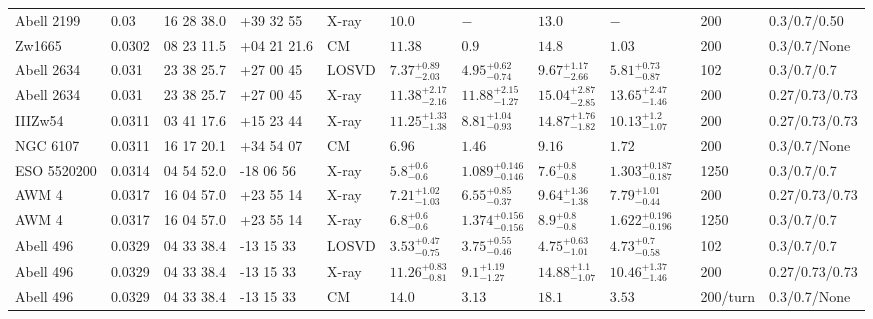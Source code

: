 \begin{landscape}
\begin{center}
{\begin{longtable}{llllllllllll}
Abell 2199 & 0.03 & 16 28 38.0 & +39 32 55 & X-ray & ${10.0}^{}_{}$ & ${-}^{}_{}$ & ${13.0}^{}_{}$ & ${-}^{}_{}$ & \citet{MA99.1} & 200 & 0.3/0.7/0.50 \\
Zw1665 & 0.0302 & 08 23 11.5 & +04 21 21.6 & CM & ${11.38}^{}_{}$ & ${0.9}^{}_{}$ & ${14.8}^{}_{}$ & ${1.03}^{}_{}$ & \citet{RI06.1} & 200 & 0.3/0.7/None \\
Abell 2634 & 0.031 & 23 38 25.7 & +27 00 45 & LOSVD & ${7.37}^{+0.89}_{-2.03}$ & ${4.95}^{+0.62}_{-0.74}$ & ${9.67}^{+1.17}_{-2.66}$ & ${5.81}^{+0.73}_{-0.87}$ & \citet{WO10.1} & 102 & 0.3/0.7/0.7 \\
Abell 2634 & 0.031 & 23 38 25.7 & +27 00 45 & X-ray & ${11.38}^{+2.17}_{-2.16}$ & ${11.88}^{+2.15}_{-1.27}$ & ${15.04}^{+2.87}_{-2.85}$ & ${13.65}^{+2.47}_{-1.46}$ & \citet{BA14.1} & 200 & 0.27/0.73/0.73 \\
IIIZw54 & 0.0311 & 03 41 17.6 & +15 23 44 & X-ray & ${11.25}^{+1.33}_{-1.38}$ & ${8.81}^{+1.04}_{-0.93}$ & ${14.87}^{+1.76}_{-1.82}$ & ${10.13}^{+1.2}_{-1.07}$ & \citet{BA14.1} & 200 & 0.27/0.73/0.73 \\
NGC 6107 & 0.0311 & 16 17 20.1 & +34 54 07 & CM & ${6.96}^{}_{}$ & ${1.46}^{}_{}$ & ${9.16}^{}_{}$ & ${1.72}^{}_{}$ & \citet{RI06.1} & 200 & 0.3/0.7/None \\
ESO 5520200 & 0.0314 & 04 54 52.0 & -18 06 56 & X-ray & ${5.8}^{+0.6}_{-0.6}$ & ${1.089}^{+0.146}_{-0.146}$ & ${7.6}^{+0.8}_{-0.8}$ & ${1.303}^{+0.187}_{-0.187}$ & \citet{GA06.1} & 1250 & 0.3/0.7/0.7 \\
AWM 4 & 0.0317 & 16 04 57.0 & +23 55 14 & X-ray & ${7.21}^{+1.02}_{-1.03}$ & ${6.55}^{+0.85}_{-0.37}$ & ${9.64}^{+1.36}_{-1.38}$ & ${7.79}^{+1.01}_{-0.44}$ & \citet{BA14.1} & 200 & 0.27/0.73/0.73 \\
AWM 4 & 0.0317 & 16 04 57.0 & +23 55 14 & X-ray & ${6.8}^{+0.6}_{-0.6}$ & ${1.374}^{+0.156}_{-0.156}$ & ${8.9}^{+0.8}_{-0.8}$ & ${1.622}^{+0.196}_{-0.196}$ & \citet{GA06.1} & 1250 & 0.3/0.7/0.7 \\
Abell 496 & 0.0329 & 04 33 38.4 & -13 15 33 & LOSVD & ${3.53}^{+0.47}_{-0.75}$ & ${3.75}^{+0.55}_{-0.46}$ & ${4.75}^{+0.63}_{-1.01}$ & ${4.73}^{+0.7}_{-0.58}$ & \citet{WO10.1} & 102 & 0.3/0.7/0.7 \\
Abell 496 & 0.0329 & 04 33 38.4 & -13 15 33 & X-ray & ${11.26}^{+0.83}_{-0.81}$ & ${9.1}^{+1.19}_{-1.27}$ & ${14.88}^{+1.1}_{-1.07}$ & ${10.46}^{+1.37}_{-1.46}$ & \citet{BA14.1} & 200 & 0.27/0.73/0.73 \\
Abell 496 & 0.0329 & 04 33 38.4 & -13 15 33 & CM & ${14.0}^{}_{}$ & ${3.13}^{}_{}$ & ${18.1}^{}_{}$ & ${3.53}^{}_{}$ & \citet{RI03.1} & 200/turn & 0.3/0.7/None \\

\end{longtable}}
\end{center}
\end{landscape}
